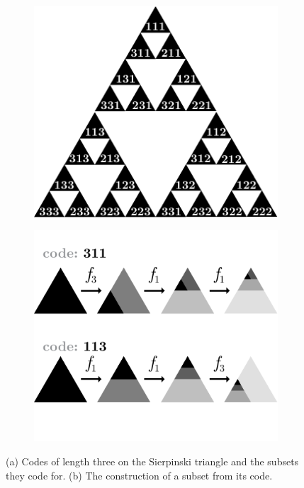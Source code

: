 \documentclass[reprint,amsmath,amssymb,aps,prl]{revtex4-1}
\begin{document}
\begin{figure}[tb]
  \centering
  \begin{subfigure}[b]{0.47\linewidth}
    \includegraphics[width=\textwidth]{../img/sierpinski-codes.pdf}
    \caption{}
    \label{fig:sierpinski-codes}
  \end{subfigure}  
  \hspace{0.015\textwidth}
  \begin{subfigure}[b]{0.47\linewidth}
    \includegraphics[width=\textwidth]{../img/code-construction.pdf}
    \caption{}
    \label{fig:code-construction}
  \end{subfigure}

  \caption{\small (a) Codes of length three on the Sierpinski triangle and the subsets they code for. (b) The construction of a subset from its code.}
  \label{figure:codes}
\end{figure}
\end{document}
